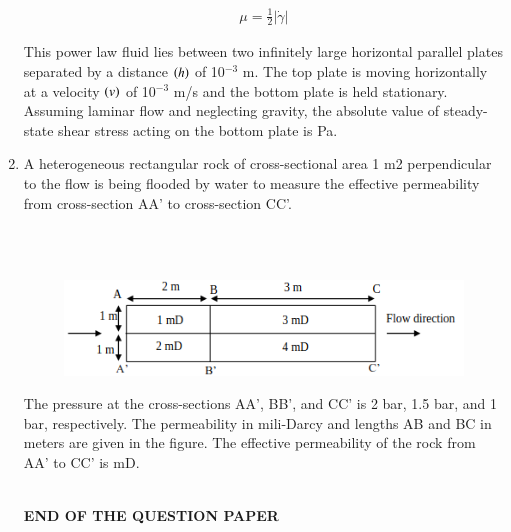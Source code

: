 \documentclass[journal,12pt,onecolumn]{IEEEtran}
\theoremstyle{remark}
\begin{document}
\begin{enumerate}
\begin{align*} 
\mu = \frac{1}{2} |\dot{\gamma}| 
\end{align*}

This power law fluid lies between two infinitely large horizontal parallel plates separated by a distance $\left(h\right)$ of 10$^{-3}$ m. The top plate is moving horizontally at a velocity $\left(v\right)$ of 10$^{-3}$ m/s and the bottom plate is held stationary. Assuming laminar flow and neglecting gravity, the absolute value of steady-state shear stress acting on the bottom plate is \underline{\hspace{2cm}} Pa.  

\hfill{}

\item A heterogeneous rectangular rock of cross-sectional area 1 m2 perpendicular to the flow is
being flooded by water to measure the effective permeability from cross-section AA' to
cross-section CC'.

\hfill{}\\\\

\begin{figure}[h!]
  \centering
  \includegraphics[width=0.8\columnwidth]{figs/pic12.png} 
   \caption*{}
  \label{fig:Q65}
\end{figure}

The pressure at the cross-sections AA', BB', and CC' is 2 bar, 1.5 bar, and 1 bar,
respectively. The permeability in mili-Darcy and lengths AB and BC in meters are given in
the figure. The effective permeability of the rock from AA' to CC' is \underline{\hspace{4cm}}mD. 
\\\\



\begin{center}
	{\LARGE \textbf{END OF THE QUESTION PAPER}}
\end{center}

\end{enumerate}
\end{document}
